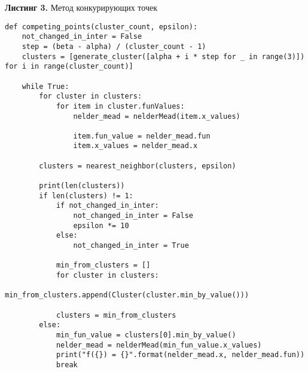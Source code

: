 \documentclass[a4paper, 12pt]{article}   	%
\begin{document}
    \textbf{Листинг 3.} Метод конкурирующих точек 
    \begin{verbatim}
def competing_points(cluster_count, epsilon):
	not_changed_in_inter = False
	step = (beta - alpha) / (cluster_count - 1)
	clusters = [generate_cluster([alpha + i * step for _ in range(3)]) for i in range(cluster_count)]

	while True:
		for cluster in clusters:
			for item in cluster.funValues:
				nelder_mead = nelderMead(item.x_values)

				item.fun_value = nelder_mead.fun
				item.x_values = nelder_mead.x

		clusters = nearest_neighbor(clusters, epsilon)

		print(len(clusters))
		if len(clusters) != 1:
			if not_changed_in_inter:
				not_changed_in_inter = False
				epsilon *= 10
			else:
				not_changed_in_inter = True

			min_from_clusters = []
			for cluster in clusters:
				min_from_clusters.append(Cluster(cluster.min_by_value()))

			clusters = min_from_clusters
		else:
			min_fun_value = clusters[0].min_by_value()
			nelder_mead = nelderMead(min_fun_value.x_values)
			print("f({}) = {}".format(nelder_mead.x, nelder_mead.fun))
			break
\end{verbatim}
\end{document}
